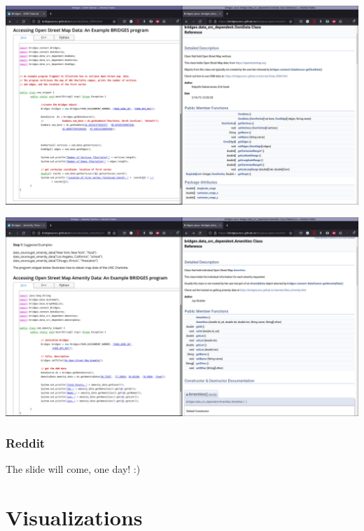 \documentclass[aspectratio=169]{beamer}
\begin{document}
\begin{frame}
  \includegraphics[width=1.02\linewidth]{dataset_figs/OSMmap.png}
\end{frame}

\begin{frame}
  \includegraphics[width=1.02\linewidth]{dataset_figs/OSMAmenities.png}
\end{frame}

\begin{frame}
  \frametitle{Reddit}

  The slide will come, one day! :)
\end{frame}



\section{Visualizations}
\end{document}

